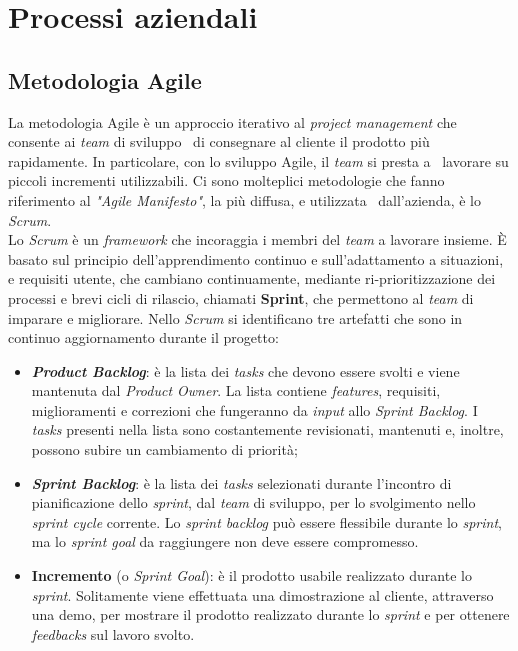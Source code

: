\section{Processi aziendali}

\subsection{Metodologia Agile}
La metodologia Agile è un approccio iterativo al \emph{project management} che consente ai \emph{team} di sviluppo \
di consegnare al cliente il prodotto più rapidamente. In particolare, con lo sviluppo Agile, il \emph{team} si presta a \
lavorare su piccoli incrementi utilizzabili. Ci sono molteplici metodologie che fanno riferimento al \emph{"Agile Manifesto"}, la più diffusa, e utilizzata \
dall'azienda, è lo \emph{Scrum}. \\

Lo \emph{Scrum} è un \emph{framework} che incoraggia i membri del \emph{team} a lavorare insieme. È basato sul principio dell'apprendimento continuo e sull'adattamento a situazioni, e requisiti utente, che cambiano continuamente, mediante ri-prioritizzazione dei processi e brevi cicli di rilascio, chiamati \textbf{Sprint}, che permettono al \emph{team} di imparare e migliorare. Nello \emph{Scrum} si identificano tre artefatti che sono in continuo aggiornamento durante il progetto:

\begin{itemize}
  \item \textbf{\emph{Product Backlog}}: è la lista dei \emph{tasks} che devono essere svolti e viene mantenuta dal \emph{Product Owner}. La lista contiene \emph{features}, requisiti, miglioramenti e correzioni che fungeranno da \emph{input} allo \emph{Sprint Backlog}. I \emph{tasks} presenti nella lista sono costantemente revisionati, mantenuti e, inoltre, possono subire un cambiamento di priorità; 
  \item \textbf{\emph{Sprint Backlog}}: è la lista dei \emph{tasks} selezionati durante l'incontro di pianificazione dello \emph{sprint}, dal \emph{team} di sviluppo, per lo svolgimento nello \emph{sprint cycle} corrente. Lo \emph{sprint backlog} può essere flessibile durante lo \emph{sprint}, ma lo \emph{sprint goal} da raggiungere non deve essere compromesso.
  \item \textbf{Incremento} (o \emph{Sprint Goal}): è il prodotto usabile realizzato durante lo \emph{sprint}. Solitamente viene effettuata una dimostrazione al cliente, attraverso una demo, per mostrare il prodotto realizzato durante lo \emph{sprint} e per ottenere \emph{feedbacks} sul lavoro svolto.
\end{itemize}

